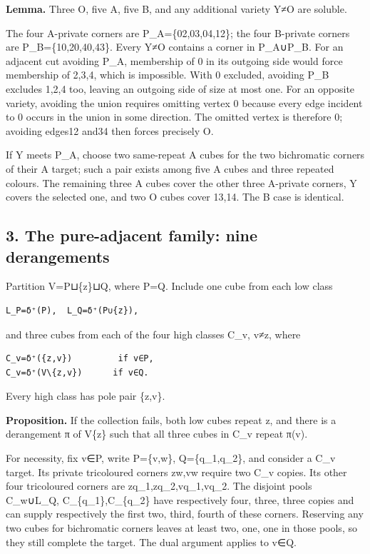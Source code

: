 \documentclass[
  10pt,
]{article}
\begin{document}
\textbf{Lemma.} Three O, five A, five B, and any additional variety Y≠O
are soluble.

The four A-private corners are P\_A=\{02,03,04,12\}; the four B-private
corners are P\_B=\{10,20,40,43\}. Every Y≠O contains a corner in
P\_A∪P\_B. For an adjacent cut avoiding P\_A, membership of 0 in its
outgoing side would force membership of 2,3,4, which is impossible. With
0 excluded, avoiding P\_B excludes 1,2,4 too, leaving an outgoing side
of size at most one. For an opposite variety, avoiding the union
requires omitting vertex 0 because every edge incident to 0 occurs in
the union in some direction. The omitted vertex is therefore 0; avoiding
edges12 and34 then forces precisely O.

If Y meets P\_A, choose two same-repeat A cubes for the two bichromatic
corners of their A target; such a pair exists among five A cubes and
three repeated colours. The remaining three A cubes cover the other
three A-private corners, Y covers the selected one, and two O cubes
cover 13,14. The B case is identical.

\hypertarget{the-pure-adjacent-family-nine-derangements}{%
\subsection*{3. The pure-adjacent family: nine
derangements}\label{the-pure-adjacent-family-nine-derangements}}

Partition V=P⊔\{z\}⊔Q, where \textbar P\textbar=\textbar Q.
Include one cube from each low class

\begin{verbatim}
L_P=δ⁺(P),  L_Q=δ⁺(P∪{z}),
\end{verbatim}

and three cubes from each of the four high classes C\_v, v≠z, where

\begin{verbatim}
C_v=δ⁺({z,v})         if v∈P,
C_v=δ⁺(V\{z,v})      if v∈Q.
\end{verbatim}

Every high class has pole pair \{z,v\}.

\textbf{Proposition.} If the collection fails, both low cubes repeat z,
and there is a derangement π of V\{z\} such that all three cubes in C\_v
repeat π(v).

For necessity, fix v∈P, write P=\{v,w\}, Q=\{q\_1,q\_2\}, and consider a
C\_v target. Its private tricoloured corners zw,vw require two C\_v
copies. Its other four tricoloured corners are zq\_1,zq\_2,vq\_1,vq\_2.
The disjoint pools C\_w∪L\_Q, C\_\{q\_1\},C\_\{q\_2\} have respectively
four, three, three copies and can supply respectively the first two,
third, fourth of these corners. Reserving any two cubes for bichromatic
corners leaves at least two, one, one in those pools, so they still
complete the target. The dual argument applies to v∈Q.
\end{document}
